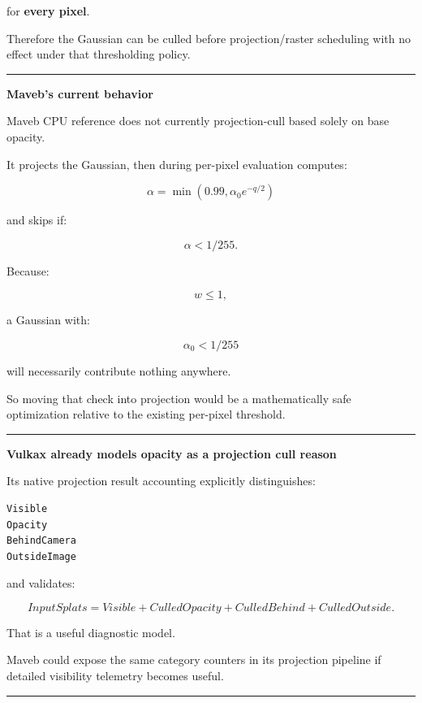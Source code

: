 for \textbf{every pixel}.

Therefore the Gaussian can be culled before projection/raster scheduling with no effect under that thresholding policy.

\begin{center}\rule{0.5\linewidth}{0.5pt}\end{center}

\textbf{Maveb's current behavior}

Maveb CPU reference does not currently projection-cull based solely on base opacity.

It projects the Gaussian, then during per-pixel evaluation computes:

\[
\alpha
=
\min(
0.99,
\alpha_0
e^{-q/2}
)
\]

and skips if:

\[
\boxed{
\alpha<
1/255.
}
\]

Because:

\[
w\le1,
\]

a Gaussian with:

\[
\alpha_0<1/255
\]

will necessarily contribute nothing anywhere.

So moving that check into projection would be a mathematically safe optimization relative to the existing per-pixel threshold.

\begin{center}\rule{0.5\linewidth}{0.5pt}\end{center}

\textbf{Vulkax already models opacity as a projection cull reason}

Its native projection result accounting explicitly distinguishes:

\protect{}\label{qdflga}%
\begin{verbatim}
Visible
Opacity
BehindCamera
OutsideImage
\end{verbatim}

and validates:

\[
InputSplats
=
Visible
+
CulledOpacity
+
CulledBehind
+
CulledOutside.
\]

That is a useful diagnostic model.

Maveb could expose the same category counters in its projection pipeline if detailed visibility telemetry becomes useful.

\begin{center}\rule{0.5\linewidth}{0.5pt}\end{center}

